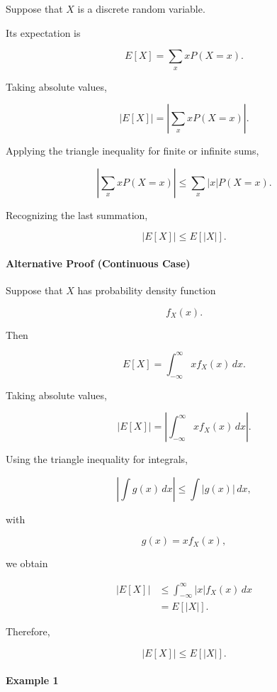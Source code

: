 \documentclass[11pt]{article}
\begin{document}
\begin{mdframed}[
		linewidth=0.8pt,
		roundcorner=6pt,
		backgroundcolor=gray!5,
		linecolor=gray!60,
		innertopmargin=10pt,
		innerbottommargin=10pt,
		innerleftmargin=10pt,
		innerrightmargin=10pt
		]
		Suppose that \(X\) is a discrete random variable.
		
		Its expectation is
		
		\[
		E[X]
		=
		\sum_x
		xP(X=x).
		\]
		
		Taking absolute values,
		
		\[
		\left|
		E[X]
		\right|
		=
		\left|
		\sum_x
		xP(X=x)
		\right|.
		\]
		
		Applying the triangle inequality for finite or infinite sums,
		
		\[
		\left|
		\sum_x
		xP(X=x)
		\right|
		\le
		\sum_x
		|x|P(X=x).
		\]
		
		Recognizing the last summation,
		
		\[
		\boxed{
			|E[X]|
			\le
			E[|X|].
		}
		\]
		
		\bigskip
		
		\paragraph{Alternative Proof (Continuous Case)}
		
		Suppose that \(X\) has probability density function
		
		\[
		f_X(x).
		\]
		
		Then
		
		\[
		E[X]
		=
		\int_{-\infty}^{\infty}
		x
		f_X(x)
		\,dx.
		\]
		
		Taking absolute values,
		
		\[
		\left|
		E[X]
		\right|
		=
		\left|
		\int_{-\infty}^{\infty}
		x
		f_X(x)
		\,dx
		\right|.
		\]
		
		Using the triangle inequality for integrals,
		
		\[
		\left|
		\int
		g(x)\,dx
		\right|
		\le
		\int
		|g(x)|\,dx,
		\]
		
		with
		
		\[
		g(x)=xf_X(x),
		\]
		
		we obtain
		
		\[
		\begin{aligned}
			|E[X]|
			&\le
			\int_{-\infty}^{\infty}
			|x|
			f_X(x)
			\,dx
			\\[0.3cm]
			&=
			E[|X|].
		\end{aligned}
		\]
		
		Therefore,
		
		\[
		\boxed{
			|E[X]|
			\le
			E[|X|].
		}
		\]
		
		\bigskip
		
		\paragraph{Example 1}
		

\end{mdframed}
\end{document}
